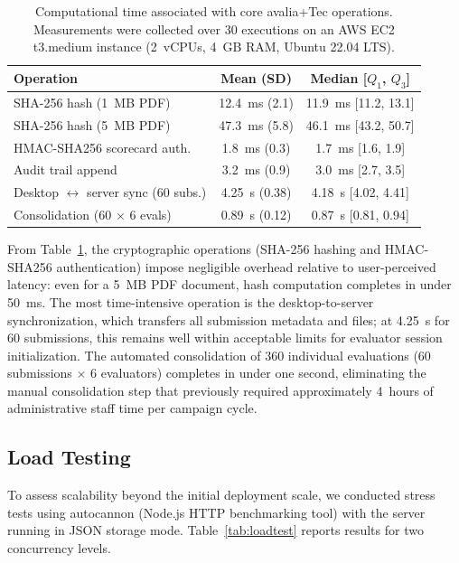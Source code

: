 \documentclass[preprint,12pt,a4paper]{elsarticle}
\begin{document}
\begin{table}[H]
\centering
\footnotesize
\begin{tabular}{|l|c|c|}
\hline
\textbf{Operation} & \textbf{Mean (SD)} & \textbf{Median [$Q_1$, $Q_3$]} \\
\hline
SHA-256 hash (1~MB PDF) & 12.4~ms (2.1) & 11.9~ms [11.2, 13.1] \\
\hline
SHA-256 hash (5~MB PDF) & 47.3~ms (5.8) & 46.1~ms [43.2, 50.7] \\
\hline
HMAC-SHA256 scorecard auth. & 1.8~ms (0.3) & 1.7~ms [1.6, 1.9] \\
\hline
Audit trail append & 3.2~ms (0.9) & 3.0~ms [2.7, 3.5] \\
\hline
Desktop $\leftrightarrow$ server sync (60 subs.) & 4.25~s (0.38) & 4.18~s [4.02, 4.41] \\
\hline
Consolidation (60 $\times$ 6 evals) & 0.89~s (0.12) & 0.87~s [0.81, 0.94] \\
\hline
\end{tabular}
\caption{Computational time associated with core avalia+Tec operations. Measurements were collected over 30 executions on an AWS EC2 t3.medium instance (2~vCPUs, 4~GB RAM, Ubuntu 22.04 LTS).}
\label{tab:performance}
\end{table}

From Table~\ref{tab:performance}, the cryptographic operations (SHA-256 hashing and HMAC-SHA256 authentication) impose negligible overhead relative to user-perceived latency: even for a 5~MB PDF document, hash computation completes in under 50~ms. The most time-intensive operation is the desktop-to-server synchronization, which transfers all submission metadata and files; at 4.25~s for 60 submissions, this remains well within acceptable limits for evaluator session initialization. The automated consolidation of 360 individual evaluations (60 submissions $\times$ 6 evaluators) completes in under one second, eliminating the manual consolidation step that previously required approximately 4~hours of administrative staff time per campaign cycle.

\subsection{Load Testing}

To assess scalability beyond the initial deployment scale, we conducted stress tests using autocannon (Node.js HTTP benchmarking tool) with the server running in JSON storage mode. Table~\ref{tab:loadtest} reports results for two concurrency levels.
\end{document}
